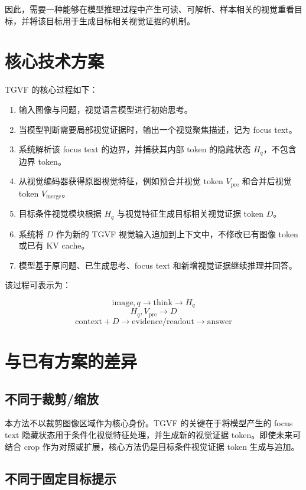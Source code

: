 \documentclass[10pt,twocolumn]{ctexart}
\begin{document}
因此，需要一种能够在模型推理过程中产生可读、可解析、样本相关的视觉重看目标，并将该目标用于生成目标相关视觉证据的机制。

\section{核心技术方案}

TGVF 的核心过程如下：

\begin{enumerate}
  \item 输入图像与问题，视觉语言模型进行初始思考。
  \item 当模型判断需要局部视觉证据时，输出一个视觉聚焦描述，记为 focus text。
  \item 系统解析该 focus text 的边界，并捕获其内部 token 的隐藏状态 $H_q$，不包含边界 token。
  \item 从视觉编码器获得原图视觉特征，例如预合并视觉 token $V_{\mathrm{pre}}$ 和合并后视觉 token $V_{\mathrm{merge}}$。
  \item 目标条件视觉模块根据 $H_q$ 与视觉特征生成目标相关视觉证据 token $D$。
  \item 系统将 $D$ 作为新的 TGVF 视觉输入追加到上下文中，不修改已有图像 token 或已有 KV cache。
  \item 模型基于原问题、已生成思考、focus text 和新增视觉证据继续推理并回答。
\end{enumerate}

该过程可表示为：

\[
\mathrm{image}, q \rightarrow \mathrm{think} \rightarrow H_q
\]
\[
H_q, V_{\mathrm{pre}} \rightarrow D
\]
\[
\mathrm{context} + D \rightarrow \mathrm{evidence/readout} \rightarrow \mathrm{answer}
\]

\section{与已有方案的差异}

\subsection{不同于裁剪/缩放}

本方法不以裁剪图像区域作为核心身份。TGVF 的关键在于将模型产生的 focus text 隐藏状态用于条件化视觉特征处理，并生成新的视觉证据 token。即使未来可结合 crop 作为对照或扩展，核心方法仍是目标条件视觉证据 token 生成与追加。

\subsection{不同于固定目标提示}
\end{document}
